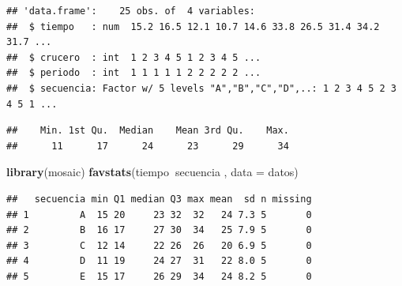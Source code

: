 \documentclass[]{book}
\newenvironment{Shaded}{\begin{snugshade}}{\end{snugshade}}
\newcommand{\KeywordTok}[1]{\textcolor[rgb]{0.13,0.29,0.53}{\textbf{#1}}}
\newcommand{\DataTypeTok}[1]{\textcolor[rgb]{0.13,0.29,0.53}{#1}}
\newcommand{\DecValTok}[1]{\textcolor[rgb]{0.00,0.00,0.81}{#1}}
\newcommand{\CommentTok}[1]{\textcolor[rgb]{0.56,0.35,0.01}{\textit{#1}}}
\newcommand{\OperatorTok}[1]{\textcolor[rgb]{0.81,0.36,0.00}{\textbf{#1}}}
\newcommand{\NormalTok}[1]{#1}
\begin{document}
\begin{verbatim}
## 'data.frame':    25 obs. of  4 variables:
##  $ tiempo   : num  15.2 16.5 12.1 10.7 14.6 33.8 26.5 31.4 34.2 31.7 ...
##  $ crucero  : int  1 2 3 4 5 1 2 3 4 5 ...
##  $ periodo  : int  1 1 1 1 1 2 2 2 2 2 ...
##  $ secuencia: Factor w/ 5 levels "A","B","C","D",..: 1 2 3 4 5 2 3 4 5 1 ...
\end{verbatim}

\begin{Shaded}
\end{Shaded}

\begin{verbatim}
##    Min. 1st Qu.  Median    Mean 3rd Qu.    Max. 
##      11      17      24      23      29      34
\end{verbatim}

\begin{Shaded}
\begin{Highlighting}[]
\KeywordTok{library}\NormalTok{(mosaic)}
\KeywordTok{favstats}\NormalTok{(tiempo}\OperatorTok{~}\NormalTok{secuencia , }\DataTypeTok{data =}\NormalTok{ datos)}
\end{Highlighting}
\end{Shaded}

\begin{verbatim}
##   secuencia min Q1 median Q3 max mean  sd n missing
## 1         A  15 20     23 32  32   24 7.3 5       0
## 2         B  16 17     27 30  34   25 7.9 5       0
## 3         C  12 14     22 26  26   20 6.9 5       0
## 4         D  11 19     24 27  31   22 8.0 5       0
## 5         E  15 17     26 29  34   24 8.2 5       0
\end{verbatim}

\begin{Shaded}
\end{Shaded}
\end{document}
